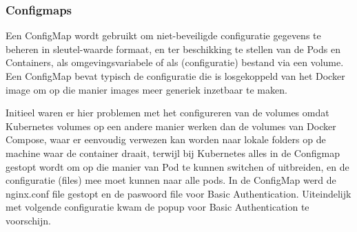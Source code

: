 \subsubsection{Configmaps} 
\autocite{Kubernetes2023}
\newline
Een ConfigMap wordt gebruikt om niet-beveiligde configuratie gegevens te beheren in sleutel-waarde formaat, en ter beschikking te stellen van de Pods en Containers, als omgevingsvariabele of als (configuratie) bestand via een volume.
Een ConfigMap bevat typisch de configuratie die is losgekoppeld van het Docker image om op die manier images meer generiek inzetbaar te maken.\textcite{Kubernetes2023}


Initieel waren er hier problemen met het configureren van de volumes omdat Kubernetes volumes op een andere manier werken dan de volumes van Docker Compose, waar er eenvoudig verwezen kan worden naar lokale folders op de machine waar de container draait, terwijl bij Kubernetes alles in de Configmap gestopt wordt om op die manier van Pod te kunnen switchen of uitbreiden, en de configuratie (files) mee moet kunnen naar alle pods.
\newline
\newline
In de ConfigMap werd de nginx.conf file gestopt en de paswoord file voor Basic Authentication.
Uiteindelijk met volgende configuratie kwam de popup voor Basic Authentication te voorschijn.
\newpage
